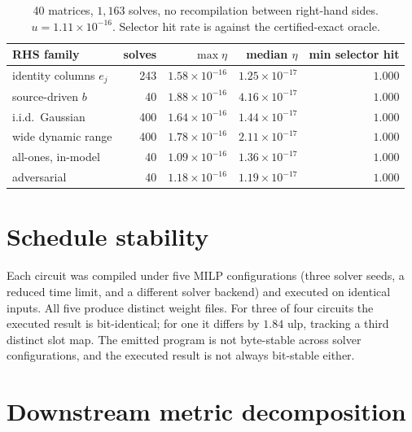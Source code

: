 \documentclass{article}
\theoremstyle{definition}
\newcommand{\bwe}{\ensuremath{\eta}}
\begin{document}
\begin{table}[h]
\caption{40 matrices, $1{,}163$ solves, no recompilation between right-hand
sides. $u=1.11\times10^{-16}$. Selector hit rate is against the certified-exact
oracle.}
\begin{center}
\begin{tabular}{lrrrr}
\toprule
RHS family & solves & $\max\bwe$ & median $\bwe$ & min selector hit \\
\midrule
identity columns $e_j$ & 243 & $1.58\times10^{-16}$ & $1.25\times10^{-17}$ & $1.000$ \\
source-driven $b$      & 40  & $1.88\times10^{-16}$ & $4.16\times10^{-17}$ & $1.000$ \\
i.i.d.\ Gaussian       & 400 & $1.64\times10^{-16}$ & $1.44\times10^{-17}$ & $1.000$ \\
wide dynamic range     & 400 & $1.78\times10^{-16}$ & $2.11\times10^{-17}$ & $1.000$ \\
all-ones, in-model     & 40  & $1.09\times10^{-16}$ & $1.36\times10^{-17}$ & $1.000$ \\
adversarial            & 40  & $1.18\times10^{-16}$ & $1.19\times10^{-17}$ & $1.000$ \\
\bottomrule
\end{tabular}
\end{center}
\end{table}

\section{Schedule stability}\label{app:milp}

Each circuit was compiled under five MILP configurations (three solver seeds, a
reduced time limit, and a different solver backend) and executed on identical
inputs. All five produce distinct weight files. For three of four circuits the
executed result is bit-identical; for one it differs by $1.84$ ulp, tracking a
third distinct slot map. The emitted program is not byte-stable across solver
configurations, and the executed result is not always bit-stable either.

\section{Downstream metric decomposition}\label{app:voltage}
\end{document}
